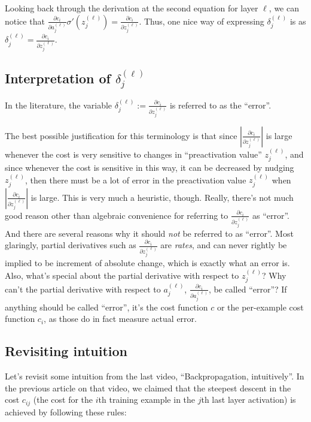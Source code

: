 \documentclass{article}
\begin{document}
	Looking back through the derivation at the second equation for layer $\ell$, we can notice that $\frac{\partial c_i}{\partial a^{(\ell)}_j} \sigma'(z^{(\ell)}_j) = \frac{\partial c_i}{\partial z^{(\ell)}_j}$. Thus, one nice way of expressing $\delta^{(\ell)}_j$ is as $\delta^{(\ell)}_j = \frac{\partial c_i}{\partial z^{(\ell)}_j}$.

	\subsection*{Interpretation of $\delta^{(\ell)}_j$}
	
	In the literature, the variable $\delta^{(\ell)}_j := \frac{\partial c_i}{\partial z^{(\ell)}_j}$ is referred to as the ``error''.
	
	The best possible justification for this terminology is that since $|\frac{\partial c_i}{\partial z^{(\ell)}_j}|$ is large whenever the cost is very sensitive to changes in ``preactivation value'' $z^{(\ell)}_j$, and since whenever the cost is sensitive in this way, it can be decreased by nudging $z^{(\ell)}_j$, then there must be a lot of error in the preactivation value $z^{(\ell)}_j$ when $|\frac{\partial c_i}{\partial z^{(\ell)}_j}|$ is large. This is very much a heuristic, though. Really, there's not much good reason other than algebraic convenience for referring to $\frac{\partial c_i}{\partial z^{(\ell)}_j}$ as ``error''. And there are several reasons why it should \textit{not} be referred to as ``error''. Most glaringly, partial derivatives such as $\frac{\partial c_i}{\partial z^{(\ell)}_j}$ are \textit{rates}, and can never rightly be implied to be increment of absolute change, which is exactly what an error is. Also, what's special about the partial derivative with respect to $z^{(\ell)}_j$? Why can't the partial derivative with respect to $a^{(\ell)}_j$, $\frac{\partial c_i}{\partial a^{(\ell)}_j}$, be called ``error''? If anything should be called ``error'', it's the cost function $c$ or the per-example cost function $c_i$, as those do in fact measure actual error.
	
	\subsection*{Revisiting intuition}
	
	Let's revisit some intuition from the last video, ``Backpropagation, intuitively''. In the previous article on that video, we claimed that the steepest descent in the cost $c_{ij}$ (the cost for the $i$th training example in the $j$th last layer activation) is achieved by following these rules:
	
\end{document}
